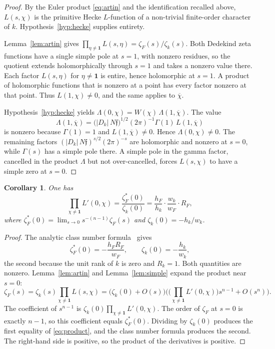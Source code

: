 \documentclass[11pt]{article}
\theoremstyle{plain}
\newtheorem{corollary}[theorem]{Corollary}
\theoremstyle{definition}
\theoremstyle{remark}
\newcommand{\triv}{\mathbf{1}}
\begin{document}
\begin{proof}
By the Euler product \eqref{eq:artin} and the identification recalled above, $L(s,\chi)$ is the primitive Hecke $L$-function of a non-trivial finite-order character of $k$.
Hypothesis~\ref{hyp:hecke} supplies entirety.

Lemma~\ref{lem:artin} gives $\prod_{\eta\neq\triv}L(s,\eta)=\zeta_F(s)/\zeta_k(s)$.
Both Dedekind zeta functions have a single simple pole at $s=1$, with nonzero residues, so the quotient extends holomorphically through $s=1$ and takes a nonzero value there.
Each factor $L(s,\eta)$ for $\eta\neq\triv$ is entire, hence holomorphic at $s=1$.
A product of holomorphic functions that is nonzero at a point has every factor nonzero at that point.
Thus $L(1,\chi)\neq 0$, and the same applies to $\overline{\chi}$.

Hypothesis~\ref{hyp:hecke} yields $\Lambda(0,\chi)=W(\chi)\,\Lambda(1,\overline{\chi})$.
The value
\[
  \Lambda(1,\overline{\chi})
  =\bigl(|D_k|\,N\mathfrak{f}\bigr)^{1/2}(2\pi)^{-1}\Gamma(1)\,L(1,\overline{\chi})
\]
is nonzero because $\Gamma(1)=1$ and $L(1,\overline{\chi})\neq 0$.
Hence $\Lambda(0,\chi)\neq 0$.
The remaining factors $(|D_k|\,N\mathfrak{f})^{s/2}(2\pi)^{-s}$ are holomorphic and nonzero at $s=0$, while $\Gamma(s)$ has a simple pole there.
A simple pole in the gamma factor, cancelled in the product $\Lambda$ but not over-cancelled, forces $L(s,\chi)$ to have a simple zero at $s=0$.
\end{proof}

\begin{corollary}
\label{cor:product}
One has
\begin{equation}
\label{eq:product}
  \prod_{\chi\neq\triv}L'(0,\chi)
  =\frac{\zeta_F^{*}(0)}{\zeta_k(0)}
  =\frac{h_F}{h_k}\cdot\frac{w_k}{w_F}\cdot R_F,
\end{equation}
where $\zeta_F^{*}(0)=\lim_{s\to 0}s^{-(n-1)}\zeta_F(s)$ and $\zeta_k(0)=-h_k/w_k$.
\end{corollary}

\begin{proof}
The analytic class number formula~\cite[Chapter~VII]{Neukirch} gives
\[
  \zeta_F^{*}(0)=-\frac{h_F R_F}{w_F},\qquad \zeta_k(0)=-\frac{h_k}{w_k},
\]
the second because the unit rank of $k$ is zero and $R_k=1$.
Both quantities are nonzero.
Lemma~\ref{lem:artin} and Lemma~\ref{lem:simple} expand the product near $s=0$:
\[
  \zeta_F(s)
  =\zeta_k(s)\prod_{\chi\neq\triv}L(s,\chi)
  =\bigl(\zeta_k(0)+O(s)\bigr)
   \Biggl(\Biggl(\prod_{\chi\neq\triv}L'(0,\chi)\Biggr)s^{n-1}+O(s^{n})\Biggr).
\]
The coefficient of $s^{n-1}$ is $\zeta_k(0)\prod_{\chi\neq\triv}L'(0,\chi)$.
The order of $\zeta_F$ at $s=0$ is exactly $n-1$, so this coefficient equals $\zeta_F^{*}(0)$.
Dividing by $\zeta_k(0)$ produces the first equality of \eqref{eq:product}, and the class number formula produces the second.
The right-hand side is positive, so the product of the derivatives is positive.
\end{proof}
\end{document}
